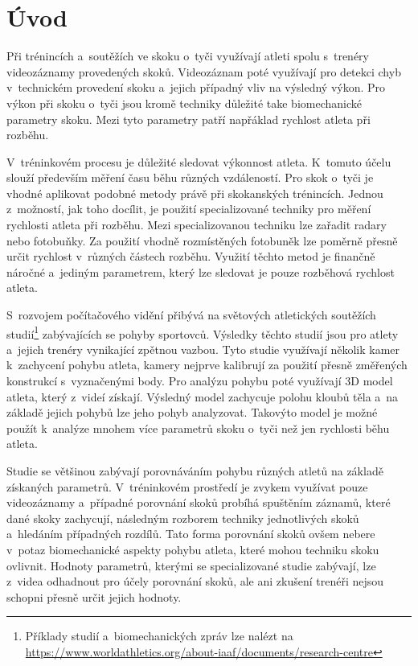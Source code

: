 \chapter*{Úvod}

Při trénincích a~soutěžích ve skoku o~tyči využívají atleti spolu s~trenéry videozáznamy provedených skoků. Videozáznam poté využívají pro detekci chyb v~technickém provedení skoku a~jejich případný vliv na výsledný výkon. Pro výkon při skoku o~tyči jsou kromě techniky důležité take biomechanické parametry skoku. Mezi tyto parametry patří napřáklad rychlost atleta při rozběhu.

V~tréninkovém procesu je důležité sledovat výkonnost atleta. K~tomuto účelu slouží především měření času běhu různých vzdáleností. Pro skok o~tyči je vhodné aplikovat podobné metody právě při skokanských trénincích. Jednou z~možností, jak toho docílit, je použití specializované techniky pro měření rychlosti atleta při rozběhu. Mezi specializovanou techniku lze zařadit radary nebo fotobuňky. Za použití vhodně rozmístěných fotobuněk lze poměrně přesně určit rychlost v~různých částech rozběhu. Využití těchto metod je finančně náročné a~jediným parametrem, který lze sledovat je pouze rozběhová rychlost atleta.

S~rozvojem počítačového vidění přibývá na světových atletických soutěžích studií\footnote{Příklady studií a~biomechanických zpráv lze nalézt na \url{https://www.worldathletics.org/about-iaaf/documents/research-centre}} zabývajících se pohyby sportovců. Výsledky těchto studií jsou pro atlety a~jejich trenéry vynikající zpětnou vazbou. Tyto studie využívají několik kamer k~zachycení pohybu atleta, kamery nejprve kalibrují za použití přesně změřených konstrukcí s~vyznačenými body. Pro analýzu pohybu poté využívají 3D model atleta, který z~videí získají. Výsledný model zachycuje polohu kloubů těla a~na základě jejich pohybů lze jeho pohyb analyzovat. Takovýto model je možné použít k~analýze mnohem více parametrů skoku o~tyči než jen rychlosti běhu atleta.

Studie se většinou zabývají porovnáváním pohybu různých atletů na základě získaných parametrů. V~tréninkovém prostředí je zvykem využívat pouze videozáznamy a~případné porovnání skoků probíhá spuštěním záznamů, které dané skoky zachycují, následným rozborem techniky jednotlivých skoků a~hledáním případných rozdílů. Tato forma porovnání skoků ovšem nebere v~potaz biomechanické aspekty pohybu atleta, které mohou techniku skoku ovlivnit. Hodnoty parametrů, kterými se specializované studie zabývají, lze z~videa odhadnout pro účely porovnání skoků, ale ani zkušení trenéři nejsou schopni přesně určit jejich hodnoty.

